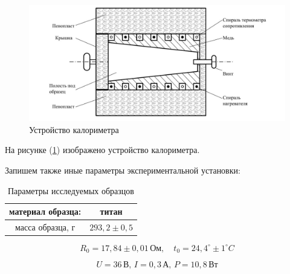 \documentclass[a4paper, 12pt]{article}
\begin{document}
\begin{figure}[h!]
	\begin{center}
		\includegraphics[scale=0.3]{img/ustfig.jpg}
		\caption{Устройство калориметра}
		\label{fig:Ris_of_facility}
	\end{center}
\end{figure}	

На рисунке (\ref{fig:Ris_of_facility}) изображено устройство калориметра.

Запишем также иные параметры экспериментальной установки:

\begin{table}[h!]
	\centering
	\begin{tabular}{|c|c|}
		\hline
		материал образца: & титан           \\ \hline
		масса образца, г  & $293,2 \pm 0,5$ \\ \hline
	\end{tabular}
	\caption{Параметры исследуемых образцов}
	\label{tab:param_of_facility}
\end{table}

$$R_{0} = 17,84 \pm 0,01 \, \text{Ом}, \quad t_{0} = 24,4^{\circ} \pm 1 ^{\circ} C$$

$$ U = 36 \, \text{В}, \, I = 0,3 \, \text{А}, \, P = 10,8 \, \text{Вт} $$
\end{document}
